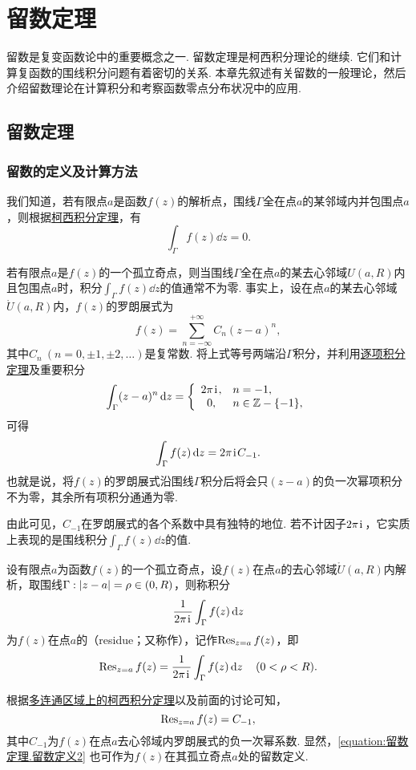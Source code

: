 \chapter{留数定理}
留数是复变函数论中的重要概念之一.
留数定理是柯西积分理论的继续.
它们和计算复函数的围线积分问题有着密切的关系.
本章先叙述有关留数的一般理论，然后介绍留数理论在计算积分和考察函数零点分布状况中的应用.

\section{留数定理}
\subsection{留数的定义及计算方法}
我们知道，若有限点\(a\)是函数\(f(z)\)的解析点，围线\(\Gamma\)全在点\(a\)的某邻域内并包围点\(a\)，则根据\hyperref[theorem:解析函数的积分表示.柯西积分定理]{柯西积分定理}，有\[
\int_{\Gamma} f(z) \dd{z} = 0.
\]

若有限点\(a\)是\(f(z)\)的一个孤立奇点，则当围线\(\Gamma\)全在点\(a\)的某去心邻域\(U(a,R)\)内且包围点\(a\)时，积分\(\int_{\Gamma} f(z) \dd{z}\)的值通常不为零.
事实上，设在点\(a\)的某去心邻域\(\mathring{U}(a,R)\)内，\(f(z)\)的罗朗展式为\[
f(z) = \sum\limits_{n=-\infty}^{+\infty} C_n (z-a)^n,
\]其中\(C_n\ (n=0,\pm1,\pm2,\dotsc)\)是复常数.
将上式等号两端沿\(\Gamma\)积分，并利用\hyperref[theorem:解析函数的级数表示.一致收敛级数的基本性质2]{逐项积分定理}及重要积分  \[
\int_{\Gamma} (z-a)^n \dd{z} = \left\{ \begin{array}{cl}
2\pi\kern1pt\mathrm{i}\kern1pt, & n=-1, \\
0,& n\in\mathbb{Z}-\{-1\},
\end{array} \right.
\]可得\[
\int_{\Gamma} f(z) \dd{z} = 2\pi\kern1pt\mathrm{i}\kern1pt C_{-1}.
\]也就是说，将\(f(z)\)的罗朗展式沿围线\(\Gamma\)积分后将会只\((z-a)\)的负一次幂项积分不为零，其余所有项积分通通为零.

由此可见，\(C_{-1}\)在罗朗展式的各个系数中具有独特的地位.
若不计因子\(2\pi\kern1pt\mathrm{i}\kern1pt\)，它实质上表现的是围线积分\(\int_{\Gamma} f(z) \dd{z}\)的值.

\begin{definition}
设有限点\(a\)为函数\(f(z)\)的一个孤立奇点，设\(f(z)\)在点\(a\)的去心邻域\(\mathring{U}(a,R)\)内解析，取围线\(\Gamma: \abs{z-a}=\rho\in(0,R)\)，则称积分\[
\frac{1}{2\pi\kern1pt\mathrm{i}\kern1pt} \int_{\Gamma} f(z) \dd{z}
\]为\(f(z)\)在点\(a\)的（residue；又称作），记作\(\operatorname{Res}_{z=a} f(z)\)，即\begin{equation}\label{equation:留数定理.留数定义1}
\operatorname{Res}_{z=a} f(z)
= \frac{1}{2\pi\kern1pt\mathrm{i}\kern1pt} \int_{\Gamma} f(z) \dd{z}
\quad(0<\rho<R).
\end{equation}
\end{definition}
根据\hyperref[theorem:解析函数的积分表示.多连通区域的柯西积分定理]{多连通区域上的柯西积分定理}以及前面的讨论可知，\begin{equation}\label{equation:留数定理.留数定义2}
\operatorname{Res}_{z=a} f(z) = C_{-1},
\end{equation}
其中\(C_{-1}\)为\(f(z)\)在点\(a\)去心邻域内罗朗展式的负一次幂系数.
显然，\cref{equation:留数定理.留数定义2} 也可作为\(f(z)\)在其孤立奇点\(a\)处的留数定义.

